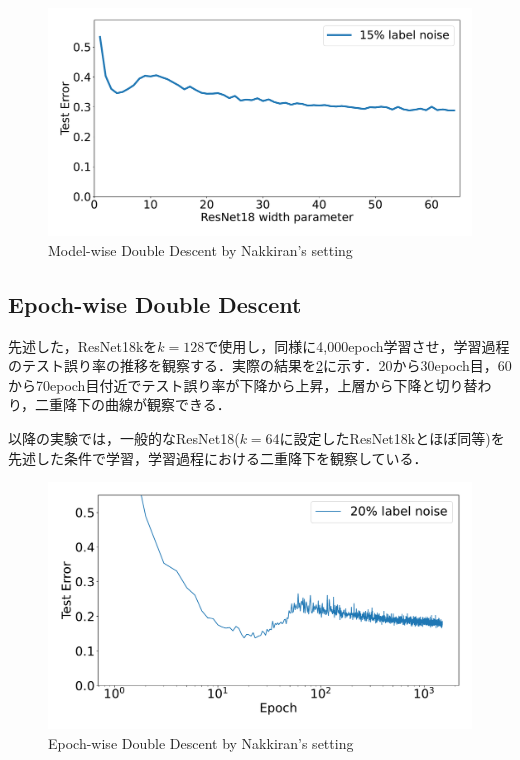 \begin{figure}[ht]
    \centering
    \includegraphics[width=1\columnwidth]{fig/DoubleDescent.pdf}
    \caption{Model-wise Double Descent by Nakkiran's setting}
    \label{fig:DD}
\end{figure}

\newpage

\subsection{Epoch-wise Double Descent}
先述した，ResNet18kを$k=128$で使用し，同様に4,000epoch学習させ，学習過程のテスト誤り率の推移を観察する．実際の結果を\cref{fig:EDD}に示す．20から30epoch目，60から70epoch目付近でテスト誤り率が下降から上昇，上層から下降と切り替わり，二重降下の曲線が観察できる．

以降の実験では，一般的なResNet18($k=64$に設定したResNet18kとほぼ同等)を先述した条件で学習，学習過程における二重降下を観察している．

\begin{figure}[ht]
    \centering
    \includegraphics[width=1\columnwidth]{fig/Epoch-wise_DoubleDescent.pdf}
    \caption{Epoch-wise Double Descent by Nakkiran's setting}
    \label{fig:EDD}
\end{figure}

\newpage